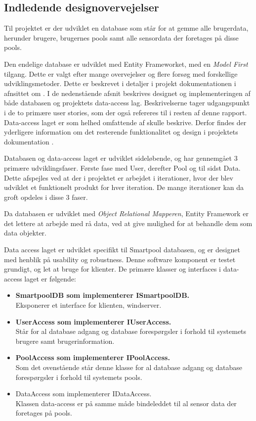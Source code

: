 \subsection{Indledende designovervejelser}\label{sec:designdatabase}

Til projektet er der udviklet en database som står for at gemme alle brugerdata, herunder brugere, brugernes pools samt alle sensordata der foretages på disse pools.

Den endelige database er udviklet med Entity Frameworket, med en \textit{Model First} tilgang. Dette er valgt efter mange overvejelser og flere forsøg med forskellige udviklingsmetoder. Dette er beskrevet i detaljer i projekt dokumentationen i afnsittet om . I de nedenstående afsnit beskrives designet og implementeringen af både databasen og projektets data-access lag. Beskrivelserne tager udgangspunkt i de to primære user stories, som der også refereres til i resten af denne rapport. Data-access laget er som helhed omfattende af skulle beskrive. Derfor findes der yderligere information om det resterende funktionalitet og design i projektets dokumentation .

Databasen og data-access laget er udviklet sideløbende, og har gennemgået 3 primære udviklingsfaser. Første fase med User, derefter Pool og til sidst Data. Dette afspejles ved at der i projektet er arbejdet i iterationer, hvor der blev udviklet et funktionelt produkt for hver iteration. De mange iterationer kan da groft opdeles i disse 3 faser.

Da databasen er udviklet med \textit{Object Relational Mapperen}, Entity Framework er det lettere at arbejde med rå data, ved at give mulighed for at behandle dem som data objekter.

Data access laget er udviklet specifikt til Smartpool databasen, og er designet med henblik på usability og robustness. Denne software komponent er testet grundigt, og let at bruge for klienter.
De primære klasser og interfaces i data-access laget er følgende:

\begin{itemize}
	\item \textbf{SmartpoolDB som implementerer ISmartpoolDB.}\\
	Eksponerer et interface for klienten, \gls{windserver}.
	\item \textbf{UserAccess som implementerer IUserAccess.}\\
	Står for al database adgang og database forespørgsler i forhold til systemets brugere samt brugerinformation.
	\item \textbf{PoolAccess som implementerer IPoolAccess.}\\
	Som det ovenstående står denne klasse for al database adgang og database forespørgsler i forhold til systemets pools.
	\item DataAccess som implementerer IDataAccess.\\
	Klassen data-access er på samme måde bindeleddet til al sensor data der foretages på pools.
\end{itemize}

